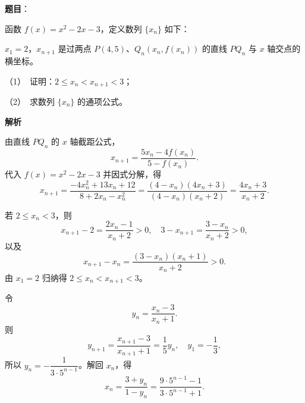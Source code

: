 \begin{answer}

\textbf{题目}：

函数 $f(x)=x^2-2x-3$，定义数列 $\{x_n\}$ 如下：

$x_1=2$，$x_{n+1}$ 是过两点 $P(4,5)\text{、}Q_n(x_n,f(x_n))$ 的直线 $PQ_n$ 与 $x$ 轴交点的横坐标。

（1）　证明：$2\leqslant x_n<x_{n+1}<3$；

（2）　求数列 $\{x_n\}$ 的通项公式。

\textbf{解析}

由直线 $PQ_n$ 的 $x$ 轴截距公式，
\nopagebreak[4]
\[
x_{n+1}=\frac{5x_n-4f(x_n)}{5-f(x_n)}.
\]
代入 $f(x)=x^2-2x-3$ 并因式分解，得
\nopagebreak[4]
\[
x_{n+1}=\frac{-4x_n^2+13x_n+12}{8+2x_n-x_n^2}
=\frac{(4-x_n)(4x_n+3)}{(4-x_n)(x_n+2)}
=\frac{4x_n+3}{x_n+2}.
\]


若 $2\leqslant x_n<3$，则
\nopagebreak[4]
\[
x_{n+1}-2=\frac{2x_n-1}{x_n+2}>0,
\quad
3-x_{n+1}=\frac{3-x_n}{x_n+2}>0,
\]
以及
\nopagebreak[4]
\[
x_{n+1}-x_n=\frac{(3-x_n)(x_n+1)}{x_n+2}>0.
\]
由 $x_1=2$ 归纳得 $2\leqslant x_n<x_{n+1}<3$。


令
\nopagebreak[4]
\[
y_n=\frac{x_n-3}{x_n+1}.
\]
则
\nopagebreak[4]
\[
y_{n+1}=\frac{x_{n+1}-3}{x_{n+1}+1}=\frac15y_n,
\quad y_1=-\frac13,
\]
所以 $y_n=-\dfrac1{3\cdot5^{n-1}}$。解回 $x_n$，得
\nopagebreak[4]
\[
x_n=\frac{3+y_n}{1-y_n}
=\frac{9\cdot5^{n-1}-1}{3\cdot5^{n-1}+1}.
\]



\end{answer}